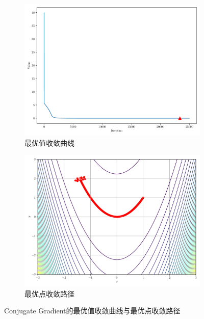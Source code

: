 \begin{figure}[!ht]
    \centering
    \begin{subfigure}{0.4\textwidth}
        \centering
        \includegraphics[width=\textwidth]{figures/Conjugate Gradient_loss.pdf}
        \caption{最优值收敛曲线}
    \end{subfigure}
    \begin{subfigure}{0.4\textwidth}
        \centering
        \includegraphics[width=\textwidth]{figures/Conjugate Gradient_points.pdf}
        \caption{最优点收敛路径}
    \end{subfigure}
    \caption{Conjugate Gradient的最优值收敛曲线与最优点收敛路径}
\end{figure}

